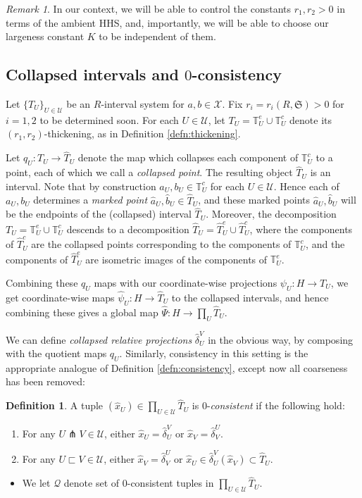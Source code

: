 \documentclass{amsart}
\theoremstyle{definition}
\newtheorem{definition}[theorem]{Definition}
\theoremstyle{remark}
\newtheorem{remark}[theorem]{Remark}
\theoremstyle{definition}
\newcommand{\calQ}{\mathcal{Q}}
\newcommand{\calU}{\mathcal{U}}
\newcommand{\calX}{\mathcal{X}}
\newcommand{\hT}{\widehat{T}}
\newcommand{\hx}{\hat{x}}
\newcommand{\ha}{\hat{a}}
\newcommand{\bT}{\mathbb{T}}
\newcommand{\hb}{\hat{b}}
\newcommand{\hd}{\hat{\delta}}
\newcommand{\hpsi}{\hat{\psi}}
\newcommand{\hPsi}{\widehat{\Psi}}
\newcommand{\nest}{\sqsubset}
\begin{document}
\begin{remark}
In our context, we will be able to control the constants $r_1,r_2>0$ in terms of the ambient HHS, and, importantly, we will be able to choose our largeness constant $K$ to be independent of them.
\end{remark}





\subsection{Collapsed intervals and $0$-consistency} \label{subsec:collapsing}

Let $\{T_U\}_{U \in \calU}$ be an $R$-interval system for $a,b \in \calX$.  Fix $r_i = r_i(R, \mathfrak S)>0$ for $i=1,2$ to be determined soon.  For each $U \in \calU$, let $T_U = \bT^e_U \cup \bT^c_U$ denote its $(r_1,r_2)$-thickening, as in Definition \ref{defn:thickening}.

Let $q_U:T_U \to \hT_U$ denote the map which collapses each component of $\bT^c_U$ to a point, each of which we call a \emph{collapsed point}.  The resulting object $\hT_U$ is an interval.  Note that by construction $a_U, b_U \in \bT^c_U$ for each $U \in \calU$.  Hence each of $a_U,b_U$ determines a \emph{marked point} $\ha_U,\hb_U \in \hT_U$, and these marked points $\ha_U,\hb_U$ will be the endpoints of the (collapsed) interval $\hT_U$.  Moreover, the decomposition $T_U = \bT^e_U \cup \bT^c_U$ descends to a decomposition $\hT_U = \hT^e_U \cup \hT^c_U$, where the components of $\hT^c_U$ are the collapsed points corresponding to the components of $\bT^c_U$, and the components of $\hT^e_U$ are isometric images of the components of $\bT^e_U$.

Combining these $q_U$ maps with our coordinate-wise projections $\psi_U:H \to T_U$, we get coordinate-wise maps $\hpsi_U:H \to \hT_U$ to the collapsed intervals, and hence combining these gives a global map $\hPsi:H \to \prod_U \hT_U$.

We can define \emph{collapsed relative projections} $\hd^V_U$ in the obvious way, by composing with the quotient maps $q_U$.  Similarly, consistency in this setting is the appropriate analogue of Definition \ref{defn:consistency}, except now all coarseness has been removed:

\begin{definition} \label{defn:Q defined}
A tuple $(\hx_U) \in \prod_{U \in \calU} \hT_U$ is $0$-\emph{consistent} if the following hold:
\begin{enumerate}
\item For any $U \pitchfork V \in \calU$, either $\hx_U = \hd^V_U$ or $\hx_V = \hd^U_V$.
\item For any $U \nest V \in \calU$, either $\hx_V = \hd^U_V$ or $\hx_U \in \hd^V_U(\hx_V) \subset \hT_U$.
\end{enumerate}
\begin{itemize}
\item We let $\calQ$ denote set of $0$-consistent tuples in $\prod_{U \in \calU} \hT_U$.
\end{itemize}
\end{definition}
\end{document}
